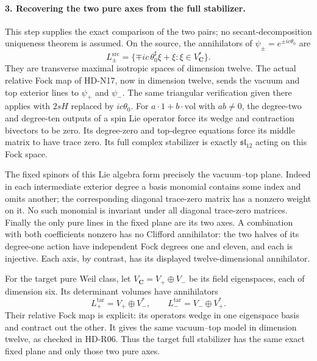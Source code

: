 \paragraph{3. Recovering the two pure axes from the full stabilizer.}
This step supplies the exact comparison of the two pairs;
no secant-decomposition uniqueness theorem is assumed.
On the source, the annihilators of
$\psi_\pm=e^{\pm ic\theta_0}$ are
\begin{equation}
 L_\pm^{\mathrm{src}}=
 \{\mp ic\,\theta_0^\sharp\xi+\xi:\xi\in V_{\mathbf C}^*\}.
                                                        \tag{N18.7}
\end{equation}
They are transverse maximal isotropic spaces of dimension twelve.
The actual relative Fock map of HD-N17, now in dimension twelve,
sends the vacuum and top exterior lines to $\psi_+$ and
$\psi_-$. The same triangular verification given there applies
with $2sH$ replaced by $ic\theta_0$.
For $a\cdot1+b\cdot\mathrm{vol}$ with $ab\ne0$, the
degree-two and degree-ten outputs of a spin Lie operator force
its wedge and contraction bivectors to be zero. Its degree-zero
and top-degree equations force its middle matrix to have trace
zero. Its full complex stabilizer is exactly
$\mathfrak{sl}_{12}$ acting on this Fock space.

The fixed spinors of this Lie algebra form precisely the
vacuum--top plane. Indeed in each intermediate exterior degree
a basis monomial contains some index and omits another;
the corresponding diagonal trace-zero matrix has a nonzero
weight on it. No such monomial is invariant under all diagonal
trace-zero matrices. Finally the only pure lines in the fixed
plane are its two axes. A combination with both coefficients
nonzero has no Clifford annihilator: the two halves of its
degree-one action have independent Fock degrees one and eleven,
and each is injective. Each axis, by contrast, has its displayed
twelve-dimensional annihilator.

For the target pure Weil class, let
$V_{\mathbf C}=V_+\oplus V_-$ be its field eigenspaces,
each of dimension six. Its determinant volumes have annihilators
\begin{equation}
 L_+^{\mathrm{tar}}=V_+\oplus V_-^*,\qquad
 L_-^{\mathrm{tar}}=V_-\oplus V_+^*.                  \tag{N18.8}
\end{equation}
Their relative Fock map is explicit: its operators wedge in
one eigenspace basis and contract out the other. It gives the
same vacuum--top model in dimension twelve, as checked in
HD-R06. Thus the target full stabilizer has the same exact
fixed plane and only those two pure axes.

